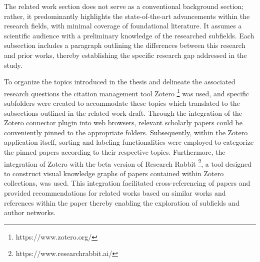 The related work section does not serve as a conventional background section; rather, it predominantly highlights the state-of-the-art advancements within the research fields, with minimal coverage of foundational literature. It assumes a scientific audience with a preliminary knowledge of the researched subfields. Each subsection includes a paragraph outlining the differences between this research and prior works, thereby establishing the specific research gap addressed in the study.

To organize the topics introduced in the thesis and delineate the associated research questions the citation management tool Zotero \footnote{https://www.zotero.org/} was used, and specific subfolders were created to accommodate these topics which translated to the subsections outlined in the related work draft. Through the integration of the Zotero connector plugin into web browsers, relevant scholarly papers could be conveniently pinned to the appropriate folders. Subsequently, within the Zotero application itself, sorting and labeling functionalities were employed to categorize the pinned papers according to their respective topics. Furthermore, the integration of Zotero with the beta version of Research Rabbit \footnote{https://www.researchrabbit.ai/}, a tool designed to construct visual knowledge graphs of papers contained within Zotero collections, was used. This integration facilitated cross-referencing of papers and provided recommendations for related works based on similar works and references within the paper thereby enabling the exploration of subfields and author networks.
